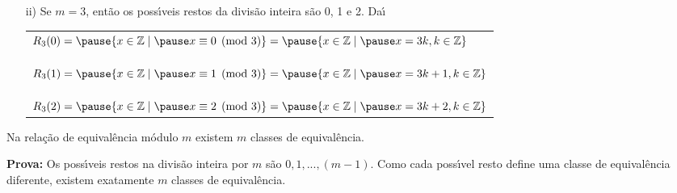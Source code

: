 \documentclass{beamer}
\begin{document}
    \begin{frame}
        \begin{exemplos}
            \begin{enumerate}
                \item[ii)] Se $m = 3$, \pause ent{\~a}o os poss{\'\i}veis restos da divis{\~a}o inteira s{\~a}o 0, 1 e 2. \pause Da{\'\i}\pause
                \vspace{.3cm}
                \begin{center}
                    \begin{tabular}{l}
                        $R_{3}(0) = \pause \{x \in \z \mid \pause x\equiv 0 \pmod{3}\} = \pause \{x \in \z \mid \pause x = 3k, k \in \z\}$\pause\\
                        \\
                        \\
                        \\
                        $R_{3}(1)  = \pause \{x \in \z \mid \pause x\equiv 1 \pmod{3}\} = \pause \{x \in \z \mid \pause x = 3k + 1, k \in \z \}$\pause\\
                        \\
                        \\
                        \\
                        $R_{3}(2) = \pause \{x \in \z \mid \pause x \equiv 2 \pmod{3}\} = \pause \{x \in \z \mid \pause x = 3k + 2, k \in \z\}$\pause
                    \end{tabular}
                \end{center}
            \end{enumerate} 
            \vspace{2cm}
        \end{exemplos}
    \end{frame}

    \begin{frame}    
        \begin{proposicao}
            Na rela{\c c}{\~a}o de equival{\^e}ncia m{\'o}dulo $m$ existem $m$ classes de equival{\^e}ncia.\pause
        \end{proposicao}
        \noindent \textbf{Prova:}
            Os poss{\'\i}veis restos na divis{\~a}o inteira por $m$ \pause s{\~a}o $0,1,...,(m-1)$. \pause Como cada poss{\'\i}vel resto define uma classe de equival{\^e}ncia diferente, \pause existem exatamente $m$ classes de equival{\^e}ncia.\hspace{.5cm}\qedsymbol\pause
    \end{frame}
\end{document}

